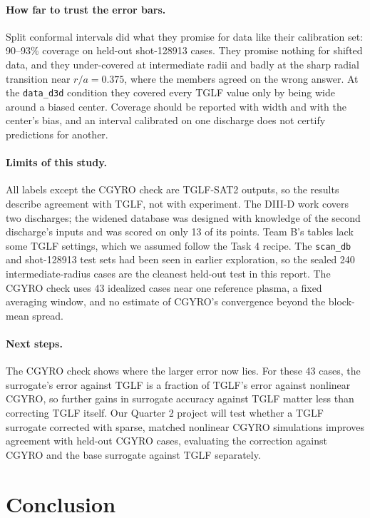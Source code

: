 \documentclass[12pt,letterpaper]{article}
\begin{document}
\paragraph{How far to trust the error bars.} Split conformal intervals did what they promise
for data like their calibration set: 90--93\% coverage on held-out shot-128913 cases. They
promise nothing for shifted data, and they under-covered at intermediate radii and badly at
the sharp radial transition near $r/a=0.375$, where the members agreed on the wrong answer.
At the \texttt{data\_d3d} condition they covered every TGLF value only by being wide around a
biased center. Coverage should be reported with width and with the center's bias, and an
interval calibrated on one discharge does not certify predictions for another.

\paragraph{Limits of this study.} All labels except the CGYRO check are TGLF-SAT2 outputs,
so the results describe agreement with TGLF, not with experiment. The DIII-D work covers two
discharges; the widened database was designed with knowledge of the second discharge's
inputs and was scored on only 13 of its points. Team B's tables lack some TGLF settings,
which we assumed follow the Task 4 recipe. The \texttt{scan\_db} and shot-128913 test sets
had been seen in earlier exploration, so the sealed 240 intermediate-radius cases are the
cleanest held-out test in this report. The CGYRO check uses 43 idealized cases near one
reference plasma, a fixed averaging window, and no estimate of CGYRO's convergence beyond
the block-mean spread.

\paragraph{Next steps.} The CGYRO check shows where the larger error now lies. For these 43
cases, the surrogate's error against TGLF is a fraction of TGLF's error against nonlinear
CGYRO, so further gains in surrogate accuracy against TGLF matter less than correcting TGLF
itself. Our Quarter 2 project will test whether a TGLF surrogate corrected with sparse,
matched nonlinear CGYRO simulations improves agreement with held-out CGYRO cases, evaluating
the correction against CGYRO and the base surrogate against TGLF separately.

\section{Conclusion}
\label{sec:conclusion}
\end{document}
